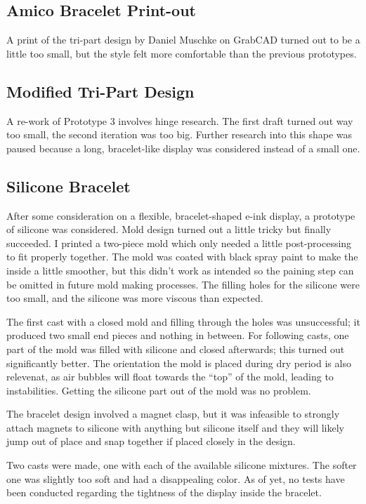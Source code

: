 \subsection{Amico Bracelet Print-out}

A print of the tri-part design by Daniel Muschke on GrabCAD turned out to be a little too small, but the style felt more comfortable than the previous prototypes.

\subsection{Modified Tri-Part Design}

A re-work of Prototype 3 involves hinge research. The first draft turned out way too small, the second iteration was too big. Further research into this shape was paused because a long, bracelet-like display was considered instead of a small one.

\subsection{Silicone Bracelet}

After some consideration on a flexible, bracelet-shaped e-ink display, a prototype of silicone was considered. Mold design turned out a little tricky but finally succeeded. I printed a two-piece mold which only needed a little post-processing to fit properly together. The mold was coated with black spray paint to make the inside a little smoother, but this didn't work as intended so the paining step can be omitted in future mold making processes. The filling holes for the silicone were too small, and the silicone was more viscous than expected.

The first cast with a closed mold and filling through the holes was unsuccessful; it produced two small end pieces and nothing in between. For following casts, one part of the mold was filled with silicone and closed afterwards; this turned out significantly better. The orientation the mold is placed during dry period is also relevenat, as air bubbles will float towards the ``top'' of the mold, leading to instabilities. Getting the silicone part out of the mold was no problem.

The bracelet design involved a magnet clasp, but it was infeasible to strongly attach magnets to silicone with anything but silicone itself and they will likely jump out of place and snap together if placed closely in the design.

Two casts were made, one with each of the available silicone mixtures. The softer one was slightly too soft and had a disappealing color. As of yet, no tests have been conducted regarding the tightness of the display inside the bracelet.

